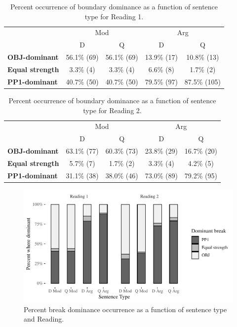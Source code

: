 \documentclass[11pt,oneside]{book}
\begin{document}
\begin{table}[!h]

\caption{\label{tab:r1dombreaks}Percent occurrence of boundary dominance as a function of sentence type for Reading 1.}
\centering
\begin{tabular}{>{\bfseries}lcccc}
\toprule
\multicolumn{1}{c}{ } & \multicolumn{2}{c}{Mod} & \multicolumn{2}{c}{Arg} \\
\cmidrule(l{3pt}r{3pt}){2-3} \cmidrule(l{3pt}r{3pt}){4-5}
  & D & Q & D & Q\\
\midrule
OBJ-dominant & 56.1\% (69) & 56.1\% (69) & 13.9\% (17) & 10.8\% (13)\\
Equal strength & 3.3\% (4) & 3.3\% (4) & 6.6\% (8) & 1.7\% (2)\\
PP1-dominant & 40.7\% (50) & 40.7\% (50) & 79.5\% (97) & 87.5\% (105)\\
\bottomrule
\end{tabular}
\end{table}
\begin{table}[!h]

\caption{\label{tab:r2dombreaks}Percent occurrence of boundary dominance as a function of sentence type for Reading 2.}
\centering
\begin{tabular}{>{\bfseries}lcccc}
\toprule
\multicolumn{1}{c}{ } & \multicolumn{2}{c}{Mod} & \multicolumn{2}{c}{Arg} \\
\cmidrule(l{3pt}r{3pt}){2-3} \cmidrule(l{3pt}r{3pt}){4-5}
  & D & Q & D & Q\\
\midrule
OBJ-dominant & 63.1\% (77) & 60.3\% (73) & 23.8\% (29) & 16.7\% (20)\\
Equal strength & 5.7\% (7) & 1.7\% (2) & 3.3\% (4) & 4.2\% (5)\\
PP1-dominant & 31.1\% (38) & 38.0\% (46) & 73.0\% (89) & 79.2\% (95)\\
\bottomrule
\end{tabular}
\end{table}

\begin{figure}
\centering
\includegraphics{4-results_files/figure-latex/bdom-1.pdf}
\caption{\label{fig:bdom}Percent break dominance occurrence as a function of sentence type and Reading.}
\end{figure}
\end{document}
